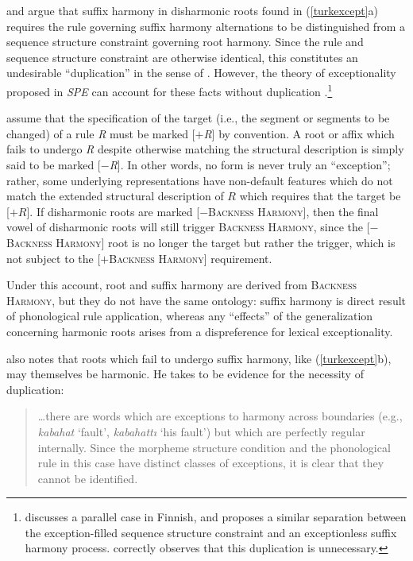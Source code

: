 \citet[212]{Anderson1974} and \citet{Iverson1978} argue that suffix harmony in disharmonic roots found in (\ref{turkexcept}a) requires the rule governing suffix harmony alternations to be distinguished from a sequence structure constraint governing root harmony. Since the rule and sequence structure constraint are otherwise identical, this constitutes an undesirable ``duplication'' in the sense of \citealt{Kisseberth1970b}. However, the theory of exceptionality proposed in \emph{SPE} can account for these facts without duplication \citep[197f.]{Zonneveld1978}.\footnote{\citet[29f.]{Kiparsky1968} discusses a parallel case in Finnish, and proposes a similar separation between the exception-filled sequence structure constraint and an exceptionless suffix harmony process. \citet[171f.]{Howard1972} correctly observes that this duplication is unnecessary.}

\citeauthor{SPE} assume that the specification of the target (i.e., the segment or segments to be changed) of a rule \emph{R} must be marked [$+$\emph{R}] by convention. A root or affix which fails to undergo \emph{R} despite otherwise matching the structural description is simply said to be marked [$-$\emph{R}]. In other words, no form is never truly an ``exception''; rather, some underlying representations have non-default features which do not match the extended structural description of $R$ which requires that the target be [$+R$]. If disharmonic roots are marked [$-$\textsc{Backness Harmony}], then the final vowel of disharmonic roots will still trigger \textsc{Backness Harmony}, since the [$-$\textsc{Backness Harmony}] root is no longer the target but rather the trigger, which is not subject to the [$+$\textsc{Backness Harmony}] requirement.

Under this account, root and suffix harmony are derived from \textsc{Backness Harmony}, but they do not have the same ontology: suffix harmony is direct result of phonological rule application, whereas any ``effects'' of the  generalization concerning harmonic roots arises from a dispreference for lexical exceptionality.

\citeauthor{Anderson1974} also notes that roots which fail to undergo suffix harmony, like (\ref{turkexcept}b), may themselves be harmonic. He takes to be evidence for the necessity of duplication:

\begin{quote}
\ldots{}there are words which are exceptions to harmony across boundaries (e.g., \emph{kabahat} `fault', \emph{kabahattı} `his fault') but which are perfectly regular internally. Since the morpheme structure condition and the phonological rule in this case have distinct classes of exceptions, it is clear that they cannot be identified. \citep[289]{Anderson1974}
\end{quote}

